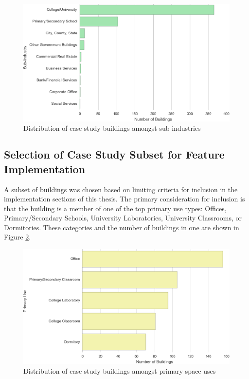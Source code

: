 \begin{figure}[ht!]
\begin{center}
\includegraphics[width=0.98\columnwidth]{figures/bar_subindustry/bar_subindustry}
\caption{Distribution of case study buildings amongst sub-industries
\label{fig:bar_subindustry}%
}
\end{center}
\end{figure}

\subsection{Selection of Case Study Subset for Feature Implementation}
\label{casestudysubset}

A subset of buildings was chosen based on limiting criteria for inclusion in the implementation sections of this thesis. The primary consideration for inclusion is that the building is a member of one of the top primary use types: Offices, Primary/Secondary Schools, University Laboratories, University Classrooms, or Dormitories. These categories and the number of buildings in one are shown in Figure \ref{fig:bar_primaryspaceuse}.

\begin{figure}[ht!]
\begin{center}
\includegraphics[width=0.98\columnwidth]{figures/bar_primaryspaceuse1/bar_primaryspaceuse}
\caption{Distribution of case study buildings amongst primary space uses
\label{fig:bar_primaryspaceuse}%
}
\end{center}
\end{figure}

